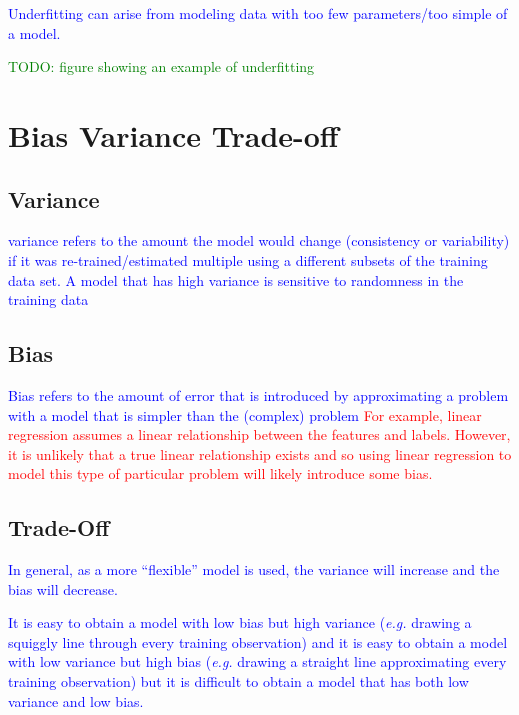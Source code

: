 \textcolor{blue}{Underfitting can arise from modeling data with too few parameters/too simple of a model.}

\textcolor{green}{TODO: figure showing an example of underfitting}


\section{Bias Variance Trade-off}

\subsection{Variance}
\textcolor{blue}{variance refers to the amount the model would change (consistency or variability) if it was re-trained/estimated multiple using a different subsets of the training data set. A model that has high variance is sensitive to randomness in the training data}


\subsection{Bias}
\textcolor{blue}{Bias refers to the amount of error that is introduced by approximating a problem with a model that is simpler than the (complex) problem} 
\textcolor{red}{For example, linear regression assumes a linear relationship between the features and labels. However, it is unlikely that a true linear relationship exists and so using linear regression to model this type of particular problem will likely introduce some bias.}

\subsection{Trade-Off}


\textcolor{blue}{In general, as a more ``flexible'' model is used, the variance will increase and the bias will decrease.}

\textcolor{blue}{It is easy to obtain a model with low bias but high variance (\emph{e.g.} drawing a squiggly line through every training observation) and it is easy to obtain a model with low variance but high bias (\emph{e.g.} drawing a straight line approximating every training observation) but it is difficult to obtain a model that has both low variance and low bias.}

